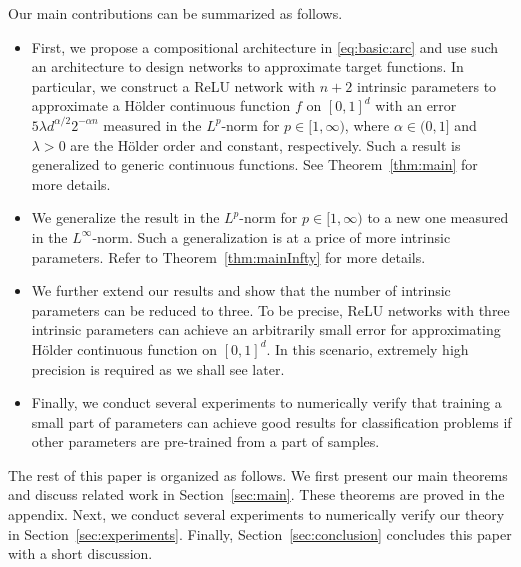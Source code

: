 \documentclass[nohyperref]{article}
\theoremstyle{plain}
\theoremstyle{definition}
\theoremstyle{remark}
\begin{document}
Our main contributions can be summarized as follows.
\begin{itemize}
	\item First, we propose a compositional architecture in \eqref{eq:basic:arc} and use such an architecture to design networks to approximate target functions. In particular, we construct a ReLU network with $n+2$ intrinsic parameters to approximate a H\"older continuous function $f$ on $[0,1]^d$ with an error  $5\lambda d^{\alpha/2}2^{-\alpha n}$
	measured in the $L^p$-norm for $p\in [1,\infty)$, where $\alpha\in (0,1]$ and $\lambda>0$ are the H\"older order and constant, respectively. Such a result is generalized to generic continuous functions. See Theorem~\ref{thm:main} for more details.
	
	\item We generalize the result in the $L^p$-norm  for $p\in[1,\infty)$ to a new one measured in the $L^\infty$-norm. Such a generalization is at a price of more intrinsic parameters. Refer to Theorem~\ref{thm:mainInfty} for more details.
	
	\item We further extend our results and show that the number of intrinsic parameters can be reduced to three. To be precise, ReLU networks with three intrinsic parameters can achieve an arbitrarily small error for approximating H\"older continuous function on $[0,1]^d$. In this scenario, extremely high precision is required as we shall see later.
	
	\item Finally, we conduct several experiments to 
	numerically verify that training a small part of parameters can achieve good results for classification problems if other parameters are pre-trained from a part of samples. 
\end{itemize}

The rest of this paper is organized as follows.
We first present our main theorems and discuss related work in Section~\ref{sec:main}.
These theorems are proved in the appendix. Next, we conduct several experiments to numerically verify our theory in Section~\ref{sec:experiments}.
Finally, Section~\ref{sec:conclusion} concludes this paper with a short discussion.
\end{document}

